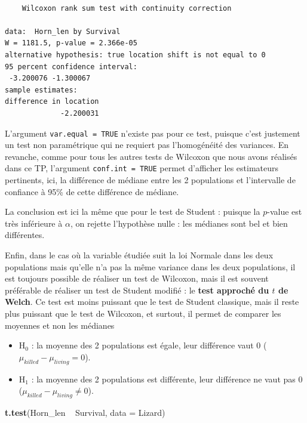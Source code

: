 \documentclass[
  a4paper,
]{article}
\newenvironment{Shaded}{\begin{snugshade}}{\end{snugshade}}
\newcommand{\DataTypeTok}[1]{\textcolor[rgb]{0.00,0.34,0.68}{#1}}
\newcommand{\KeywordTok}[1]{\textcolor[rgb]{0.12,0.11,0.11}{\textbf{#1}}}
\newcommand{\NormalTok}[1]{\textcolor[rgb]{0.12,0.11,0.11}{#1}}
\newcommand{\OperatorTok}[1]{\textcolor[rgb]{0.12,0.11,0.11}{#1}}
\newcommand{\StringTok}[1]{\textcolor[rgb]{0.75,0.01,0.01}{#1}}
\providecommand{\tightlist}{%
  \setlength{\itemsep}{0pt}\setlength{\parskip}{0pt}}
\begin{document}
\begin{verbatim}

    Wilcoxon rank sum test with continuity correction

data:  Horn_len by Survival
W = 1181.5, p-value = 2.366e-05
alternative hypothesis: true location shift is not equal to 0
95 percent confidence interval:
 -3.200076 -1.300067
sample estimates:
difference in location 
             -2.200031 
\end{verbatim}

L'argument \texttt{var.equal\ =\ TRUE} n'existe pas pour ce test, puisque c'est justement un test non paramétrique qui ne requiert pas l'homogénéité des variances. En revanche, comme pour tous les autres tests de Wilcoxon que nous avons réalisés dans ce TP, l'argument \texttt{conf.int\ =\ TRUE} permet d'afficher les estimateurs pertinents, ici, la différence de médiane entre les 2 populations et l'intervalle de confiance à 95\% de cette différence de médiane.

La conclusion est ici la même que pour le test de Student : puisque la \(p\)-value est très inférieure à \(\alpha\), on rejette l'hypothèse nulle : les médianes sont bel et bien différentes.

Enfin, dans le cas où la variable étudiée suit la loi Normale dans les deux populations mais qu'elle n'a pas la même variance dans les deux populations, il est toujours possible de réaliser un test de Wilcoxon, mais il est souvent préférable de réaliser un test de Student modifié : le \textbf{test approché du \(t\) de Welch}. Ce test est moins puissant que le test de Student classique, mais il reste plus puissant que le test de Wilcoxon, et surtout, il permet de comparer les moyennes et non les médianes

\begin{itemize}
\tightlist
\item
  H\(_0\) : la moyenne des 2 populations est égale, leur différence vaut 0 (\(\mu_{killed}-\mu_{living} = 0\)).
\item
  H\(_1\) : la moyenne des 2 populations est différente, leur différence ne vaut pas 0 (\(\mu_{killed}-\mu_{living} \neq 0\)).
\end{itemize}

\begin{Shaded}
\begin{Highlighting}[]
\KeywordTok{t.test}\NormalTok{(Horn_len }\OperatorTok{~}\StringTok{ }\NormalTok{Survival, }\DataTypeTok{data =}\NormalTok{ Lizard)}
\end{Highlighting}
\end{Shaded}
\end{document}

